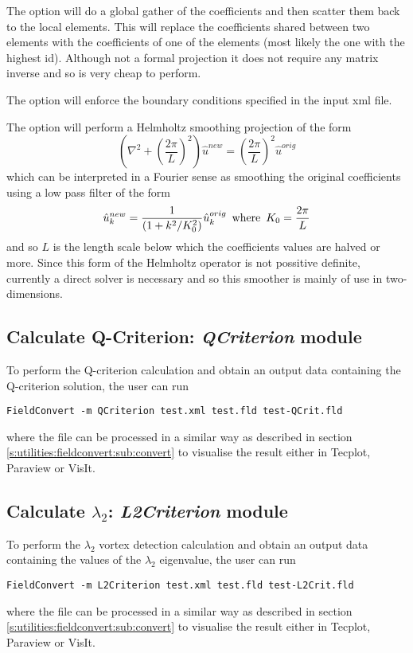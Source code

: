 The option  will do a global gather of the
coefficients and then scatter them back to the local elements. This
will replace the coefficients shared between two elements with the
coefficients of one of the elements (most likely the one with the
highest id). Although not a formal projection it does not require any
matrix inverse and so is very cheap to perform.

The option  will enforce the boundary conditions
specified in the input xml file.

The option  will perform a Helmholtz
smoothing projection of the form
\[
\left (\nabla^2 + \left (\frac{2 \pi}{L}\right )^2 \right ) \hat{u}^{new} =
\left (\frac{2 \pi}{L}\right )^2 \hat{u}^{orig}
\]
which can be interpreted in a Fourier sense as smoothing the original
coefficients using a low pass filter of the form
\[
\hat{u}_k^{new} = \frac{1}{(1 + k^2/K_0^2)} \hat{u}_k^{orig} \mbox{\,  where  \,}
K_0 = \frac{2 \pi}{L}
\]
and so $L$ is the length scale below which the coefficients values are
halved or more. Since this form of the Helmholtz operator is not
possitive definite, currently a direct solver is necessary and so this
smoother is mainly of use in two-dimensions.

\subsection{Calculate Q-Criterion: \textit{QCriterion} module}
To perform the Q-criterion calculation and obtain an output
data containing the Q-criterion solution, the user can run
%
\begin{lstlisting}[style=BashInputStyle]
FieldConvert -m QCriterion test.xml test.fld test-QCrit.fld
\end{lstlisting}
%
where the file  can be processed in a similar
way as described in section \ref{s:utilities:fieldconvert:sub:convert}
to visualise the result either in Tecplot, Paraview or VisIt.
%
%
%

\subsection{Calculate $\lambda_2$: \textit{L2Criterion} module}
To perform the $\lambda_2$ vortex detection calculation and obtain an output
data containing the values of the $\lambda_2$ eigenvalue, the user can run
%
\begin{lstlisting}[style=BashInputStyle]
  FieldConvert -m L2Criterion test.xml test.fld test-L2Crit.fld
\end{lstlisting}
%
where the file  can be processed in a similar
way as described in section \ref{s:utilities:fieldconvert:sub:convert}
to visualise the result either in Tecplot, Paraview or VisIt.
%
%
%

